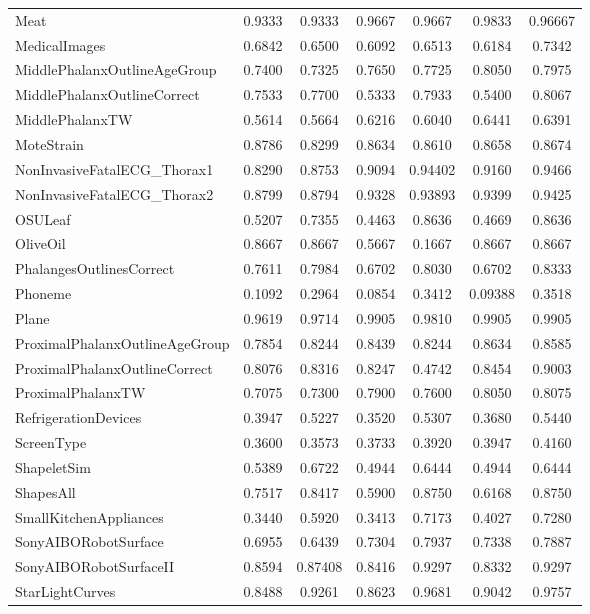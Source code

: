 \begin{longtable}[c]{p{5cm}*{6}{c}}
Meat &0.9333 &0.9333 &0.9667 &0.9667 &0.9833 &0.96667 \\
MedicalImages &0.6842 &0.6500 &0.6092 &0.6513 &0.6184 &0.7342 \\
MiddlePhalanxOutlineAgeGroup &0.7400 &0.7325 &0.7650 &0.7725 &0.8050 &0.7975 \\
MiddlePhalanxOutlineCorrect &0.7533 &0.7700 &0.5333 &0.7933 &0.5400 &0.8067 \\
MiddlePhalanxTW &0.5614 &0.5664 &0.6216 &0.6040 &0.6441 &0.6391 \\
MoteStrain &0.8786 &0.8299 &0.8634 &0.8610 &0.8658 &0.8674 \\
NonInvasiveFatalECG\_Thorax1 &0.8290 &0.8753 &0.9094 &0.94402 &0.9160 &0.9466 \\
NonInvasiveFatalECG\_Thorax2 &0.8799 &0.8794 &0.9328 &0.93893 &0.9399 &0.9425 \\
OSULeaf &0.5207 &0.7355 &0.4463 &0.8636 &0.4669 &0.8636 \\
OliveOil &0.8667 &0.8667 &0.5667 &0.1667 &0.8667 &0.8667 \\
PhalangesOutlinesCorrect &0.7611 &0.7984 &0.6702 &0.8030 &0.6702 &0.8333 \\
Phoneme &0.1092 &0.2964 &0.0854 &0.3412 &0.09388 &0.3518 \\
Plane &0.9619 &0.9714 &0.9905 &0.9810 &0.9905 &0.9905 \\
ProximalPhalanxOutlineAgeGroup &0.7854 &0.8244 &0.8439 &0.8244 &0.8634 &0.8585 \\
ProximalPhalanxOutlineCorrect &0.8076 &0.8316 &0.8247 &0.4742 &0.8454 &0.9003 \\
ProximalPhalanxTW &0.7075 &0.7300 &0.7900 &0.7600 &0.8050 &0.8075 \\
RefrigerationDevices &0.3947 &0.5227 &0.3520 &0.5307 &0.3680 &0.5440 \\
ScreenType &0.3600 &0.3573 &0.3733 &0.3920 &0.3947 &0.4160 \\
ShapeletSim &0.5389 &0.6722 &0.4944 &0.6444 &0.4944 &0.6444 \\
ShapesAll &0.7517 &0.8417 &0.5900 &0.8750 &0.6168 &0.8750 \\
SmallKitchenAppliances &0.3440 &0.5920 &0.3413 &0.7173 &0.4027 &0.7280 \\
SonyAIBORobotSurface &0.6955 &0.6439 &0.7304 &0.7937 &0.7338 &0.7887 \\
SonyAIBORobotSurfaceII &0.8594 &0.87408 &0.8416 &0.9297 &0.8332 &0.9297 \\
StarLightCurves &0.8488 &0.9261 &0.8623 &0.9681 &0.9042 &0.9757 \\

\end{longtable}
